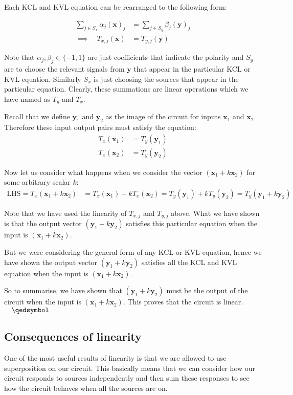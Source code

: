 \documentclass[14pt,a5paper,twoside]{book}
\begin{document}
Each KCL and KVL equation can be rearranged to the following form:

\begin{align*}
\sum_{j\in S_x} \alpha_j (\mathbf{x})_j &= \sum_{j\in S_y} \beta_j (\mathbf{y})_j \\
\implies\quad T_{x,j}(\mathbf{x}) &= T_{y,j}(\mathbf{y})
\end{align*}

Note that $\alpha_j,\beta_j\in\{-1,1\}$ are just coefficients that indicate the polarity and $S_y$ are to choose the relevant signals from $\mathbf{y}$ that appear in the particular KCL or KVL equation. Similarly $S_x$ is just choosing the sources that appear in the particular equation. Clearly, these summations are linear operations which we have named as $T_y$ and $T_x$.

Recall that we define $\mathbf{y}_1$ and $\mathbf{y}_2$ as the image of the circuit for inputs $\mathbf{x}_1$ and $\mathbf{x}_2$. Therefore these input output pairs must satisfy the equation:
\begin{align*}
T_x(\mathbf{x}_1) &= T_y(\mathbf{y}_1)\\
T_x(\mathbf{x}_2) &= T_y(\mathbf{y}_2)
\end{align*}

Now let us consider what happens when we consider the vector $(\mathbf{x}_1+k\mathbf{x}_2)$ for some arbitrary scalar $k$:
\begin{align*}
\mathrm{LHS} = T_x(\mathbf{x}_1+k\mathbf{x}_2) &= T_x(\mathbf{x}_1)+kT_x(\mathbf{x}_2) = T_y(\mathbf{y}_1)+kT_y(\mathbf{y}_2) = T_y(\mathbf{y}_1+k\mathbf{y}_2)
\end{align*}

Note that we have used the linearity of $T_{x,j}$ and $T_{y,j}$ above. What we have shown is that the output vector $(\mathbf{y}_1+k\mathbf{y}_2)$ satisfies this particular equation when the input is $(\mathbf{x}_1+k\mathbf{x}_2)$.

But we were considering the general form of any KCL or KVL equation, hence we have shown the output vector $(\mathbf{y}_1+k\mathbf{y}_2)$ satisfies all the KCL and KVL equation when the input is $(\mathbf{x}_1+k\mathbf{x}_2)$.

So to summarise, we have shown that $(\mathbf{y}_1+k\mathbf{y}_2)$ must be the output of the circuit when the input is $(\mathbf{x}_1+k\mathbf{x}_2)$. This proves that the circuit is linear. $\quad\qedsymbol$

\subsection{Consequences of linearity}
One of the most useful results of linearity is that we are allowed to use superposition on our circuit. This basically means that we can consider how our circuit responds to sources independently and then sum these responses to see how the circuit behaves when all the sources are on.
\end{document}
